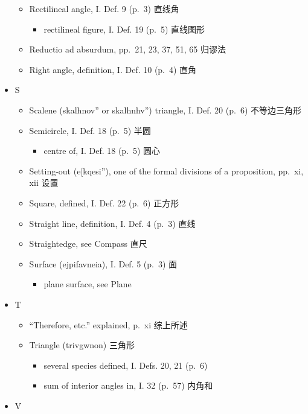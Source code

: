 \documentclass[
]{book}
\providecommand{\tightlist}{%
  \setlength{\itemsep}{0pt}\setlength{\parskip}{0pt}}
\begin{document}
\begin{itemize}
  \begin{itemize}
  \tightlist
  \item
    Rectilineal angle, I. Def. 9 (p.~3) 直线角

    \begin{itemize}
    \tightlist
    \item
      rectilineal figure, I. Def. 19 (p.~5) 直线图形
    \end{itemize}
  \item
    Reductio ad absurdum, pp.~21, 23, 37, 51, 65 归谬法
  \item
    Right angle, definition, I. Def. 10 (p.~4) 直角
  \end{itemize}
\item
  S

  \begin{itemize}
  \tightlist
  \item
    Scalene (skalhnov'' or skalhnhv'') triangle, I. Def. 20 (p.~6) 不等边三角形
  \item
    Semicircle, I. Def. 18 (p.~5) 半圆

    \begin{itemize}
    \tightlist
    \item
      centre of, I. Def. 18 (p.~5) 圆心
    \end{itemize}
  \item
    Setting-out (e{[}kqesi''), one of the formal divisions of a proposition, pp.~xi, xii 设置
  \item
    Square, defined, I. Def. 22 (p.~6) 正方形
  \item
    Straight line, definition, I. Def. 4 (p.~3) 直线
  \item
    Straightedge, see Compass 直尺
  \item
    Surface (ejpifavneia), I. Def. 5 (p.~3) 面

    \begin{itemize}
    \tightlist
    \item
      plane surface, see Plane\\
    \end{itemize}
  \end{itemize}
\item
  T

  \begin{itemize}
  \tightlist
  \item
    ``Therefore, etc.'' explained, p.~xi 综上所述
  \item
    Triangle (trivgwnon) 三角形

    \begin{itemize}
    \tightlist
    \item
      several species defined, I. Defs. 20, 21 (p.~6)\\
    \item
      sum of interior angles in, I. 32 (p.~57) 内角和
    \end{itemize}
  \end{itemize}
\item
  V


\end{itemize}
\end{document}
